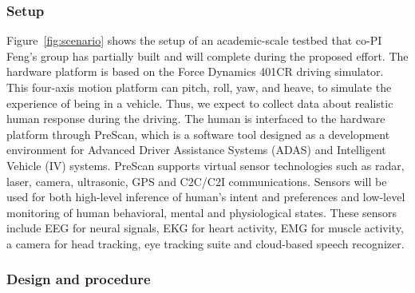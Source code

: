 \subsubsection{Setup}
Figure~\ref{fig:scenario} shows the setup of an academic-scale testbed that co-PI Feng's group has partially built and will complete during the proposed effort. The hardware platform is based on the Force Dynamics 401CR driving simulator. This four-axis motion platform can pitch, roll, yaw, and heave, to simulate the experience of being in a vehicle. Thus, we expect to collect data about realistic human response during the driving. The human is interfaced to the hardware platform through PreScan, which is a software tool designed as a development environment for Advanced Driver Assistance Systems (ADAS) and Intelligent Vehicle (IV) systems. PreScan supports virtual sensor technologies such as radar, laser, camera, ultrasonic, GPS and C2C/C2I communications. 
Sensors will be used for both high-level inference of human's intent and preferences and low-level monitoring of human behavioral, mental and physiological states. These sensors include EEG for neural signals, EKG for heart activity, EMG for muscle activity, a camera for head tracking, eye tracking suite and cloud-based speech recognizer.

\subsubsection{Design and procedure}

